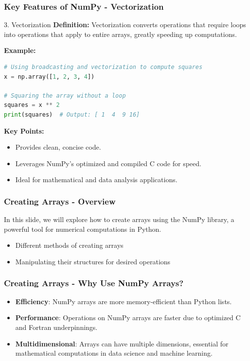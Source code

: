 \documentclass{beamer}
\begin{document}
\begin{frame}[fragile]
    \frametitle{Key Features of NumPy - Vectorization}
    \begin{block}{3. Vectorization}
        \textbf{Definition:} Vectorization converts operations that require loops into operations that apply to entire arrays, greatly speeding up computations.

        \textbf{Example:}
        \begin{lstlisting}[language=Python]
# Using broadcasting and vectorization to compute squares
x = np.array([1, 2, 3, 4])

# Squaring the array without a loop
squares = x ** 2
print(squares)  # Output: [ 1  4  9 16]
        \end{lstlisting}

        \textbf{Key Points:}
        \begin{itemize}
            \item Provides clean, concise code.
            \item Leverages NumPy's optimized and compiled C code for speed.
            \item Ideal for mathematical and data analysis applications.
        \end{itemize}
    \end{block}
\end{frame}

\begin{frame}[fragile]
    \frametitle{Creating Arrays - Overview}
    In this slide, we will explore how to create arrays using the NumPy library, a powerful tool for numerical computations in Python. 
    \begin{itemize}
        \item Different methods of creating arrays
        \item Manipulating their structures for desired operations
    \end{itemize}
\end{frame}

\begin{frame}[fragile]
    \frametitle{Creating Arrays - Why Use NumPy Arrays?}
    \begin{itemize}
        \item \textbf{Efficiency}: NumPy arrays are more memory-efficient than Python lists.
        \item \textbf{Performance}: Operations on NumPy arrays are faster due to optimized C and Fortran underpinnings.
        \item \textbf{Multidimensional}: Arrays can have multiple dimensions, essential for mathematical computations in data science and machine learning.
    \end{itemize}
\end{frame}
\end{document}
